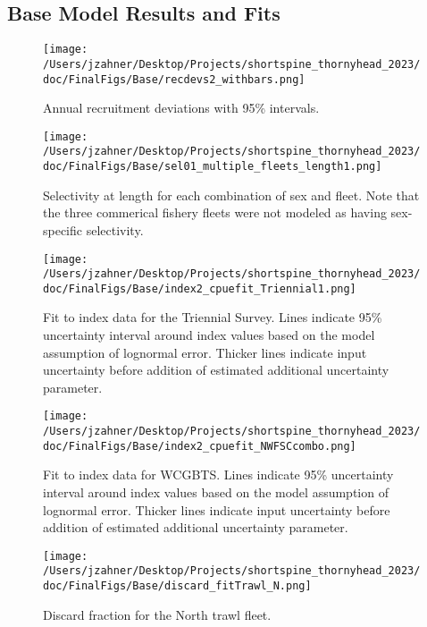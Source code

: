 \documentclass[11pt,
  english,
  letterpaper,
]{article}
\begin{document}
\clearpage

\hypertarget{base-model-results-and-fits}{%
\subsection{Base Model Results and Fits}\label{base-model-results-and-fits}}

\begin{figure}
\centering
\texttt{[image: /Users/jzahner/Desktop/Projects/shortspine\_thornyhead\_2023/doc/FinalFigs/Base/recdevs2\_withbars.png]}
\caption{Annual recruitment deviations with 95\% intervals.\label{fig:recdevs}}
\end{figure}

\begin{figure}
\centering
\texttt{[image: /Users/jzahner/Desktop/Projects/shortspine\_thornyhead\_2023/doc/FinalFigs/Base/sel01\_multiple\_fleets\_length1.png]}
\caption{Selectivity at length for each combination of sex and fleet. Note that the three commerical fishery fleets were not modeled as having sex-specific selectivity.\label{fig:selcurvs}}
\end{figure}

\begin{figure}
\centering
\texttt{[image: /Users/jzahner/Desktop/Projects/shortspine\_thornyhead\_2023/doc/FinalFigs/Base/index2\_cpuefit\_Triennial1.png]}
\caption{Fit to index data for the Triennial Survey. Lines indicate 95\% uncertainty interval around index values based on the model assumption of lognormal error. Thicker lines indicate input uncertainty before addition of estimated additional uncertainty parameter.\label{fig:fitsTri1}}
\end{figure}

\begin{figure}
\centering
\texttt{[image: /Users/jzahner/Desktop/Projects/shortspine\_thornyhead\_2023/doc/FinalFigs/Base/index2\_cpuefit\_NWFSCcombo.png]}
\caption{Fit to index data for WCGBTS. Lines indicate 95\% uncertainty interval around index values based on the model assumption of lognormal error. Thicker lines indicate input uncertainty before addition of estimated additional uncertainty parameter.\label{fig:fitscombo}}
\end{figure}

\begin{figure}
\centering
\texttt{[image: /Users/jzahner/Desktop/Projects/shortspine\_thornyhead\_2023/doc/FinalFigs/Base/discard\_fitTrawl\_N.png]}
\caption{Discard fraction for the North trawl fleet.\label{fig:northtrl_disc}}
\end{figure}
\end{document}
